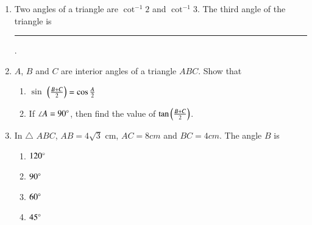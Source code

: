 \begin{enumerate}
\hfill{}\item Two angles of a triangle are  $\cot^{-1}2$ and $\cot^{-1}3$. The third angle of the
triangle is \rule{1cm}{0.1pt}.
%
\hfill{}
%
\item $A$, $B$ and $C$ are interior angles of a triangle $ABC$. Show that
\hfill{}
\begin{enumerate}
\item  $\sin$ $ \left({\frac {B+C}{2}}\right) = \cos {\frac {A}{2}}$
\item  If $\angle A = 90 \degree$, then find the value of $\tan \left({\frac{B+C}{2}}\right)$.
\end{enumerate} 
%
	\item In $\triangle$ $ABC$, $AB = {4\sqrt{3}}$ cm, $AC = 8 cm$ and $BC = 4 cm$. The angle $B$ is
	\hfill{}
	\begin{multicols}{4}
				\begin{enumerate}
\item $120\degree$
\item $90\degree$
\item $60\degree$
\item $45\degree$
				\end{enumerate}
\end{multicols}
%
\end{enumerate}
